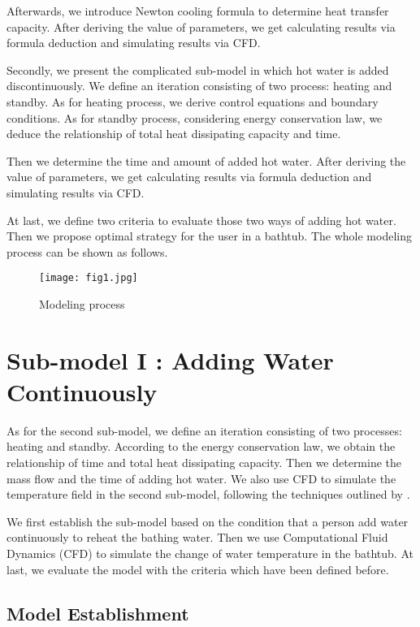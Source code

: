 \documentclass{mcmthesis}
\begin{document}
Afterwards, we introduce Newton cooling formula to determine heat transfer
capacity. After deriving the value of parameters, we get calculating results 
via formula deduction and simulating results via CFD.

Secondly, we present the complicated sub-model in which hot water is
added discontinuously. We define an iteration consisting of two process:
heating and standby. As for heating process, we derive control equations and 
boundary conditions. As for standby process, considering energy conservation law, 
we deduce the relationship of total heat dissipating capacity and time.

Then we determine the time and amount of added hot water. After deriving the 
value of parameters, we get calculating results via formula deduction and 
simulating results via CFD.

At last, we define two criteria to evaluate those two ways of adding hot water. 
Then we propose optimal strategy for the user in a bathtub.
The whole modeling process can be shown as follows.

\begin{figure}[h] 
\centering
\texttt{[image: fig1.jpg]}
\caption{Modeling process} \label{fig1}
\end{figure}

\section{Sub-model I : Adding Water Continuously}

As for the second sub-model, we define an iteration consisting of two processes: 
heating and standby. According to the energy conservation law, we obtain the 
relationship of time and total heat dissipating capacity. Then we determine 
the mass flow and the time of adding hot water. We also use CFD to simulate 
the temperature field in the second sub-model, following the techniques 
outlined by \textcite{website2024}.

We first establish the sub-model based on the condition that a person add water 
continuously to reheat the bathing water. Then we use Computational Fluid 
Dynamics (CFD) to simulate the change of water temperature in the bathtub. At 
last, we evaluate the model with the criteria which have been defined before.

\subsection{Model Establishment}
\end{document}
